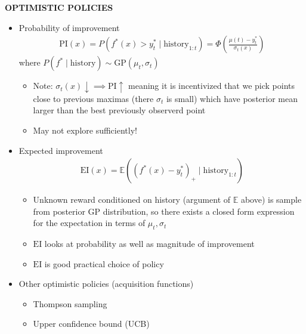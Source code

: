 \begin{whitebox}{\textbf{OPTIMISTIC POLICIES}}
    \begin{itemize}
        \item Probability of improvement
        \begin{align*}
            \mathrm{PI}(x)=P(f^*(x)>y_t^*\mid\mathrm{history}_{1:t})=\Phi\left(\frac{\mu(t)-y^*_t}{\sigma_t(x)}\right)
        \end{align*}
        where $P(f^*\mid\mathrm{history})\sim\mathrm{GP}(\mu_t,\sigma_t)$
        \begin{itemize}
            \item Note: $\sigma_t(x)\downarrow\implies\mathrm{PI}\uparrow$ meaning it is incentivized that we pick points close to previous maximas (there $\sigma_t$ is small) which have posterior mean larger than the best previously observerd point
            \item May not explore sufficiently!
        \end{itemize}
        \item Expected improvement
        \begin{align*}
            \mathrm{EI}(x)=\mathbb{E}((f^*(x)-y_t^*)_+\mid\mathrm{history}_{1:t})
        \end{align*}
        \begin{itemize}
            \item Unknown reward conditioned on history (argument of $\mathbb{E}$ above) is sample from posterior GP distribution, so there exists a closed form expression for the expectation in terms of $\mu_t,\sigma_t$
            \item $\mathrm{EI}$ looks at probability as well as magnitude of improvement
            \item $\mathrm{EI}$ is good practical choice of policy
        \end{itemize}
        \item Other optimistic policies (acquisition functions)
        \begin{itemize}
            \item Thompson sampling
            \item Upper confidence bound (UCB)
        \end{itemize}
    \end{itemize}
    \begin{center}
    \end{center}
\end{whitebox}

